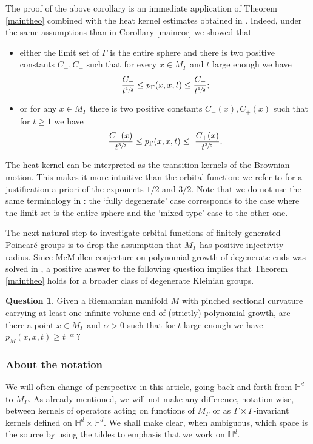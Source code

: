 \documentclass[10pt]{amsart}
\theoremstyle{plain}
\theoremstyle{definition}
\newtheorem*{question}{Question}
\newcommand{\HH}{\mathbb{H}}
\begin{document}
The proof of the above corollary is an immediate application of Theorem \ref{maintheo} combined with the heat kernel estimates obtained in \cite{artmoiheatcounting1}. Indeed, under the same assumptions than in Corollary \ref{maincor} we showed \cite[Th.\,1.10]{artmoiheatcounting1} that
\begin{itemize}
\item either the limit set of $\Gamma$ is the entire sphere and there is two positive constants $C_-, C_+$ such that for every $x \in M_{\Gamma}$ and $t$ large enough we have
\[
\frac{C_-}{t^{\sfrac{1}{2}}} \le p_{\Gamma}(x,x,t) \le \frac{C_+}{t^{\sfrac{1}{2}}} ;
\]
\item or for any $x \in M_{\Gamma}$ there is two positive constants $C_-(x), C_+(x)$ such that for $t \ge 1$ we have
\[
\frac{ C_-(x)}{t^{\sfrac{3}{2}}} \le p_{\Gamma}(x,x,t) \le \ \frac{C_+(x)}{t^{\sfrac{3}{2}}}.
\]
\end{itemize}

The heat kernel can be interpreted as the transition kernels of the Brownian motion. This makes it more intuitive than the orbital function: we refer to \cite{artmoiheatcounting1} for a justification a priori of the exponents $1/2$ and $3/2$. Note that we do not use the same terminology in \cite{artmoiheatcounting1}: the `fully degenerate' case corresponds to the case where the limit set is the entire sphere and the `mixed type' case to the other one.

The next natural step to investigate orbital functions of finitely generated Poincaré groups is to drop the assumption that $M_{\Gamma}$ has positive injectivity radius. Since McMullen conjecture on polynomial growth of degenerate ends was solved in \cite[Volume growth th., p.\,5]{artendinglamination}, a positive answer to the following question implies that Theorem \ref{maintheo} holds for a broader class of degenerate Kleinian groups.

\begin{question}
Given a Riemannian manifold $M$ with pinched sectional curvature carrying at least one infinite volume end of (strictly) polynomial growth, are there a point $x \in M_{\Gamma}$ and $\alpha > 0$ such that for $t$ large enough we have
$ p_{M}(x,x,t) \ge t^{-\alpha} \ ?$
\end{question}

\subsubsection*{About the notation} We will often change of perspective in this article, going back and forth from $\HH^d$ to $M_{\Gamma}$. As already mentioned, we will not make any difference, notation-wise, between kernels of operators acting on functions of $M_{\Gamma}$ or as $\Gamma \times \Gamma$-invariant kernels defined on $\HH^d \times \HH^d$. We shall make clear, when ambiguous, which space is the source by using the tildes to emphasis that we work on $\HH^d$.
\end{document}
